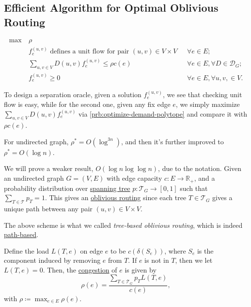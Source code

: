 \subsection{Efficient Algorithm for Optimal Oblivious Routing}
\[
	\begin{aligned}
		\max ~ & \rho                                                                                                                          \\
		       & f_e^{(u, v)} \text{ defines a unit flow for pair \((u, v) \in V \times V\) } & \forall e \in E;                               \\
		       & \sum_{u, v \in V} D(u, v) f_e^{(u, v)}  \leq \rho c(e)                       & \forall e \in E, \forall D \in \mathcal{D} _G; \\
		       & f_e^{(u, v)} \geq 0                                                          & \forall e \in E, \forall u, v, \in V.
	\end{aligned}
\]

To design a separation oracle, given a solution \(f_e^{(u, v)}\), we see that checking unit flow is easy, while for the second one, given any fix edge \(e\), we simply maximize \(\sum_{u, v \in V} D(u, v) f_e^{(u, v)}\) via \autoref{prb:optimize-demand-polytope} and compare it with \(\rho c(e)\).

\begin{theorem}
	For undirected graph, \(\rho ^{\ast} = O(\log^{3 n} )\), and then it's further improved to \(\rho ^{\ast} = O(\log n)\).
\end{theorem}

We will prove a weaker result, \(O(\log n \log \log n)\), due to the notation. Given an undirected graph \(G = (V, E)\) with edge capacity \(c \colon E \to \mathbb{R} _+\), and a probability distribution over \hyperref[def:spanning-tree]{spanning tree} \(p\colon \mathcal{T} _G \to [0, 1]\) such that \(\sum_{T \in \mathcal{T} } p_T = 1\). This gives an \hyperref[prb:oblivious-routing]{oblivious routing} since each tree \(T \in \mathcal{T} _G\) gives a unique path between any pair \((u, v) \in V \times V\).

\begin{notation}\label{not:tree-based-oblivious-routing}
	The above scheme is what we called \emph{tree-based oblivious routing}, which is indeed \hyperref[def:path-based-oblivious-routing]{path-based}.
\end{notation}

Define the load \(L(T, e)\) on edge \(e\) to be \(c(\delta (S_e))\), where \(S_e\) is the component induced by removing \(e\) from \(T\). If \(e\) is not in \(T\), then we let \(L(T, e) = 0\). Then, the \hyperref[def:congestion-of-oblivious-routing]{congestion} of \(e\) is given by
\[
	\rho (e)
	= \frac{\sum_{T \in \mathcal{T} _G} p_T L(T, e)}{c(e)},
\]
with \(\rho \coloneqq \max _{e \in E} \rho (e)\).

